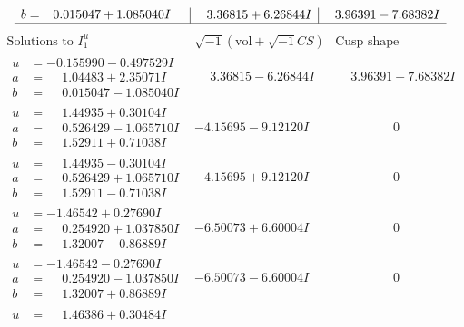 \documentclass[1p]{elsarticle_modified}
\theoremstyle{definition}
\newcommand{\I}{\sqrt{-1}}
\begin{document}
$$\begin{array}{c|c|c}
\begin{aligned}
b &= \phantom{-}0.015047 + 1.085040 I\end{aligned}
 & \phantom{-}3.36815 + 6.26844 I & \phantom{-}3.96391 - 7.68382 I\\
 \hline 
 \end{array}$$\newpage$$\begin{array}{c|c|c}  
\text{Solutions to }I^u_{1}& \I (\text{vol} + \sqrt{-1}CS) & \text{Cusp shape}\\
 \hline 
\begin{aligned}
u &= -0.155990 - 0.497529 I \\
a &= \phantom{-}1.04483 + 2.35071 I \\
b &= \phantom{-}0.015047 - 1.085040 I\end{aligned}
 & \phantom{-}3.36815 - 6.26844 I & \phantom{-}3.96391 + 7.68382 I \\ \hline\begin{aligned}
u &= \phantom{-}1.44935 + 0.30104 I \\
a &= \phantom{-}0.526429 - 1.065710 I \\
b &= \phantom{-}1.52911 + 0.71038 I\end{aligned}
 & -4.15695 - 9.12120 I & \phantom{-0.000000 } 0 \\ \hline\begin{aligned}
u &= \phantom{-}1.44935 - 0.30104 I \\
a &= \phantom{-}0.526429 + 1.065710 I \\
b &= \phantom{-}1.52911 - 0.71038 I\end{aligned}
 & -4.15695 + 9.12120 I & \phantom{-0.000000 } 0 \\ \hline\begin{aligned}
u &= -1.46542 + 0.27690 I \\
a &= \phantom{-}0.254920 + 1.037850 I \\
b &= \phantom{-}1.32007 - 0.86889 I\end{aligned}
 & -6.50073 + 6.60004 I & \phantom{-0.000000 } 0 \\ \hline\begin{aligned}
u &= -1.46542 - 0.27690 I \\
a &= \phantom{-}0.254920 - 1.037850 I \\
b &= \phantom{-}1.32007 + 0.86889 I\end{aligned}
 & -6.50073 - 6.60004 I & \phantom{-0.000000 } 0 \\ \hline\begin{aligned}
u &= \phantom{-}1.46386 + 0.30484 I \\

\end{aligned}
\end{array}$$
\end{document}
